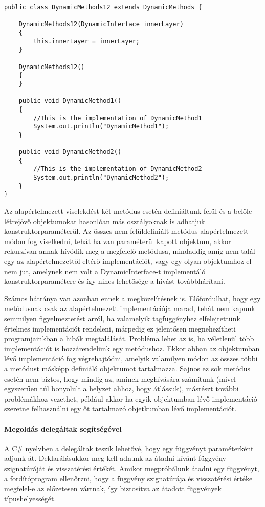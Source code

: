 \begin{lstlisting}
public class DynamicMethods12 extends DynamicMethods {

	DynamicMethods12(DynamicInterface innerLayer)
	{
		this.innerLayer = innerLayer;
	}

	DynamicMethods12()
	{
	}
	
	public void DynamicMethod1()
	{
	    //This is the implementation of DynamicMethod1
		System.out.println("DynamicMethod1");
	}
	
	public void DynamicMethod2()
	{
	    //This is the implementation of DynamicMethod2
		System.out.println("DynamicMethod2");
	}
}
\end{lstlisting}

Az alapértelmezett viselekdést két metódus esetén definiáltunk felül és a belőle létrejövő objektumokat hasonlóan más
osztályoknak is adhatjuk konstruktorparaméterül. Az összes nem felüldefiniált metódus alapértelmezett módon fog viselkedni,
tehát ha van paraméterül kapott objektum, akkor rekurzívan annak hívódik meg a megfelelő metódusa, mindaddig amíg nem talál
egy az alapértelmezettől eltérő implementációt, vagy egy olyan objektumhoz el nem jut,
amelynek nem volt a DynamicInterface-t implementáló konstruktorparamétere és így
nincs lehetősége a hívást továbbhárítani.

Számos hátránya van azonban ennek a megközelítésnek is. Előfordulhat, hogy egy metódusnak csak az alapértelmezett implementációja marad,
tehát nem kapunk semmilyen figyelmeztetést arról, ha valamelyik tagfüggényhez elfelejtettünk értelmes implementációt
rendeleni, márpedig ez jelentősen megnehezítheti programjainkban a hibák megtalálását. Probléma lehet az is, ha 
véletlenül több implementációt is hozzárendelünk egy metódushoz. Ekkor abban az objektumban lévő implementáció fog végrehajtódni,
amelyik valamilyen módon az összes többi a metódust másképp definiáló objektumot tartalmazza. Sajnos ez sok metódus esetén nem biztos, hogy mindig az, aminek
meghívására számítunk (mivel egyszerűen túl bonyolult a helyzet ahhoz, hogy átlássuk),
másrészt további problémákhoz vezethet, például akkor ha egyik objektumban lévő implementáció szeretne
felhasználni egy őt tartalmazó objetkumban lévő implementációt.

\paragraph{Megoldás delegáltak segítségével}

A C\# nyelvben a delegáltak teszik lehetővé, hogy egy függvényt paraméterként adjunk át. Deklarálásukkor
meg kell adnunk az átadni kívánt függvény szignatúráját és visszatérési értékét. Amikor megpróbálunk átadni
egy függvényt, a fordítóprogram ellenőrzni, hogy a függvény szignatúrája és visszatérési értéke megfelel-e
az előzetesen vártnak, így biztosítva az átadott függvények típushelyességét.

